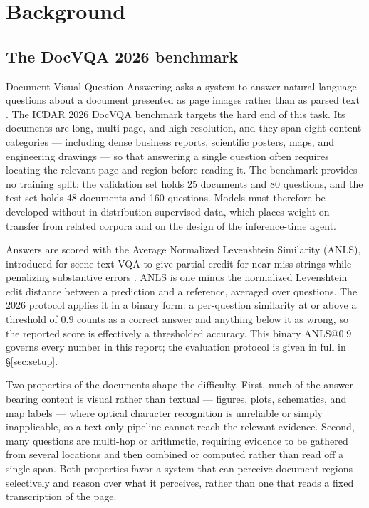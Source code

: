 \section{Background}
\label{sec:background}

\subsection{The DocVQA 2026 benchmark}

Document Visual Question Answering asks a system to answer natural-language questions about a document presented as page images rather than as parsed text \citep{docvqa}. The ICDAR 2026 DocVQA benchmark targets the hard end of this task. Its documents are long, multi-page, and high-resolution, and they span eight content categories --- including dense business reports, scientific posters, maps, and engineering drawings --- so that answering a single question often requires locating the relevant page and region before reading it. The benchmark provides no training split: the validation set holds 25 documents and 80 questions, and the test set holds 48 documents and 160 questions. Models must therefore be developed without in-distribution supervised data, which places weight on transfer from related corpora and on the design of the inference-time agent.

Answers are scored with the Average Normalized Levenshtein Similarity (ANLS), introduced for scene-text VQA to give partial credit for near-miss strings while penalizing substantive errors \citep{stvqa}. ANLS is one minus the normalized Levenshtein edit distance between a prediction and a reference, averaged over questions. The 2026 protocol applies it in a binary form: a per-question similarity at or above a threshold of 0.9 counts as a correct answer and anything below it as wrong, so the reported score is effectively a thresholded accuracy. This binary ANLS@0.9 governs every number in this report; the evaluation protocol is given in full in \S\ref{sec:setup}.

Two properties of the documents shape the difficulty. First, much of the answer-bearing content is visual rather than textual --- figures, plots, schematics, and map labels --- where optical character recognition is unreliable or simply inapplicable, so a text-only pipeline cannot reach the relevant evidence. Second, many questions are multi-hop or arithmetic, requiring evidence to be gathered from several locations and then combined or computed rather than read off a single span. Both properties favor a system that can perceive document regions selectively and reason over what it perceives, rather than one that reads a fixed transcription of the page.

